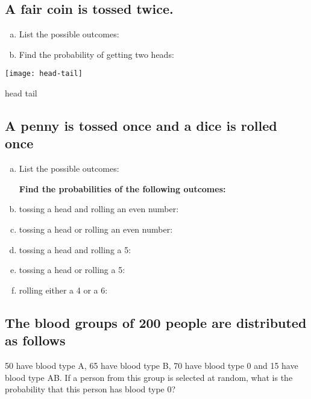 \subsection{A fair coin is tossed twice.}


\begin{enumerate}[a)] 
\item List the possible outcomes: \hrulefill
\item Find the probability of getting two heads: \hrulefill
\end{enumerate}

\vspace{-8em}
\begin{flushright}
	\texttt{[image: head-tail]}%
	
	head \hspace{5em} tail\hspace*{2.5em}
\end{flushright}


\subsection{A penny is tossed once and a dice is rolled once}

\begin{enumerate}[a)] 
\item List the possible outcomes: 	 \hrulefill

\textbf{Find the probabilities of the following outcomes:}
\item tossing a head and rolling an even number: \hrulefill
\item tossing a head or rolling an even number: \hrulefill
\item tossing a head and rolling a 5: \hrulefill	
\item tossing a head or rolling a 5: \hrulefill 	
\item rolling either a 4 or a 6: \hrulefill	
\end{enumerate}


\subsection{The blood groups of 200 people are distributed as follows}
50 have blood type A, 65 have blood type B, 70 have blood type 0 and 15 have blood type AB. If a person from this group is selected at random, what is the probability that this person has blood type 0?


